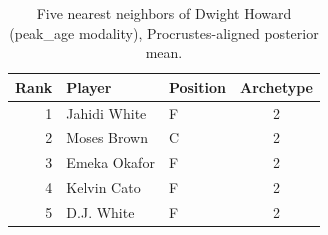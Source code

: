 \begin{table}[htbp]
  \centering\small
  \begin{tabular}{rllc}
    \toprule
    Rank & Player & Position & Archetype \\
    \midrule
    1 & Jahidi White & F & 2 \\
    2 & Moses Brown & C & 2 \\
    3 & Emeka Okafor & F & 2 \\
    4 & Kelvin Cato & F & 2 \\
    5 & D.J. White & F & 2 \\
    \bottomrule
  \end{tabular}
  \caption{Five nearest neighbors of Dwight Howard (peak_age modality), Procrustes-aligned posterior mean.}
  \label{tab:Dwight_Howard_neighbors_peak_age}
\end{table}


